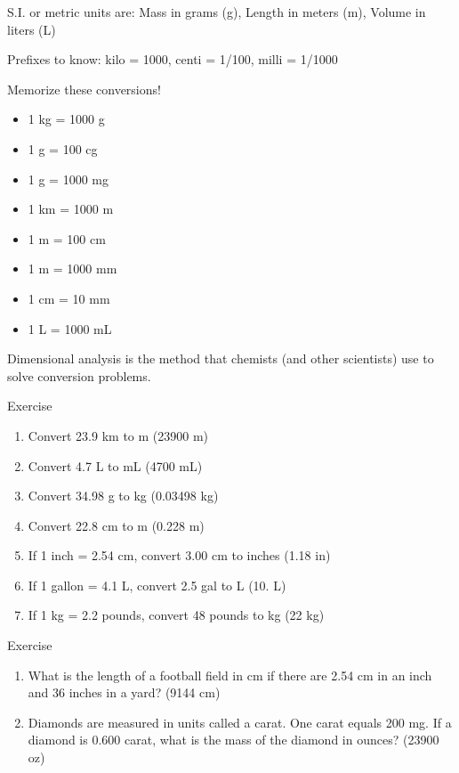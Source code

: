 \documentclass[../hchem.tex]{subfiles}
\begin{document}
S.I. or metric units are: Mass in grams (g), Length in meters (m), Volume in liters (L)

Prefixes to know: kilo = 1000, centi = 1/100, milli = 1/1000

Memorize these conversions!
\begin{itemize}
    \item 1 kg = 1000 g 
    \item 1 g = 100 cg 
    \item 1 g = 1000 mg 
    \item 1 km = 1000 m 
    \item 1 m = 100 cm 
    \item 1 m = 1000 mm 
    \item 1 cm = 10 mm 
    \item 1 L = 1000 mL 
\end{itemize}

Dimensional analysis is the method that chemists (and other scientists) use to solve conversion problems.

Exercise 
\begin{enumerate}
    \item Convert 23.9 km to m (23900 m)
    \item Convert 4.7 L to mL (4700 mL)
    \item Convert 34.98 g to kg (0.03498 kg)
    \item Convert 22.8 cm to m (0.228 m)
    \item If 1 inch = 2.54 cm, convert 3.00 cm to inches (1.18 in)
    \item If 1 gallon = 4.1 L, convert 2.5 gal to L (10. L)
    \item If 1 kg = 2.2 pounds, convert 48 pounds to kg (22 kg)
\end{enumerate}

Exercise 
\begin{enumerate}
    \item What is the length of a football field in cm if there are 2.54 cm in an inch and 36 inches in a yard? (9144 cm)
    \item Diamonds are measured in units called a carat. One carat equals 200 mg. If a diamond is 0.600 carat, what is the mass of the diamond in ounces? (23900 oz)
\end{enumerate}
\end{document}
